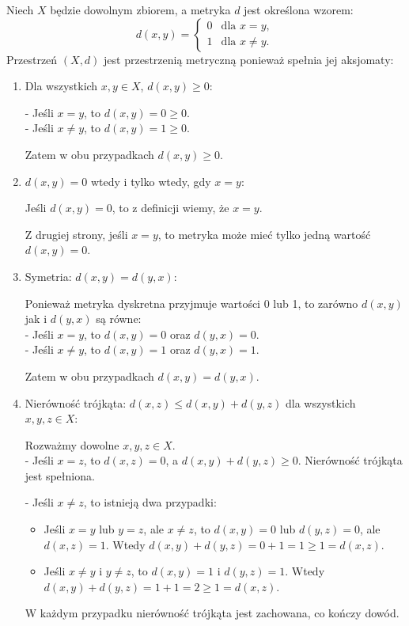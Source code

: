 \documentclass{article}
\theoremstyle{definition}
\theoremstyle{definition}
\theoremstyle{definition}
\theoremstyle{definition}
\theoremstyle{definition}
\theoremstyle{definition}
\theoremstyle{definition}
\begin{document}
Niech $X$ będzie dowolnym zbiorem, a metryka $d$ jest określona wzorem:
\[
d(x,y) = \begin{cases}
    0 & \text{dla } x=y, \\
    1 & \text{dla } x \neq y.
\end{cases}
\]
Przestrzeń \((X,d)\) jest przestrzenią metryczną ponieważ spełnia jej aksjomaty:
\begin{enumerate}
    \item Dla wszystkich \( x, y \in X \), \( d(x, y) \geq 0 \):
    
    - Jeśli \( x = y \), to \( d(x, y) = 0 \geq 0 \).\\
    - Jeśli \( x \neq y \), to \( d(x, y) = 1 \geq 0 \).
    
    Zatem w obu przypadkach \( d(x, y) \geq 0 \).
    
    \item \( d(x, y) = 0 \) wtedy i tylko wtedy, gdy \( x = y \):
    
    Jeśli \( d(x, y) = 0 \), to z definicji wiemy, że \( x = y \).

    Z drugiej strony, jeśli \( x = y \), to metryka może mieć tylko jedną wartość \( d(x, y) = 0 \).

    \item Symetria: \( d(x, y) = d(y, x) \):
    
    Ponieważ metryka dyskretna przyjmuje wartości 0 lub 1, to zarówno \( d(x, y) \) jak i \( d(y, x) \) są równe:\\
    - Jeśli \( x = y \), to \( d(x, y) = 0 \) oraz \( d(y, x) = 0 \).\\
    - Jeśli \( x \neq y \), to \( d(x, y) = 1 \) oraz \( d(y, x) = 1 \).
    
    Zatem w obu przypadkach \( d(x, y) = d(y, x) \).
    
    \item Nierówność trójkąta: \( d(x, z) \leq d(x, y) + d(y, z) \) dla wszystkich \( x, y, z \in X \):
    
    Rozważmy dowolne \( x, y, z \in X \).\\
    - Jeśli \( x = z \), to \( d(x, z) = 0 \), a \( d(x, y) + d(y, z) \geq 0 \). Nierówność trójkąta jest spełniona.
    
    - Jeśli \( x \neq z \), to istnieją dwa przypadki:
    \begin{itemize}
        \item Jeśli \( x = y \) lub \( y = z \), ale \( x \neq z \), to \( d(x, y) = 0 \) lub \( d(y, z) = 0 \), ale \( d(x, z) = 1 \). Wtedy \( d(x, y) + d(y, z) = 0 + 1 = 1 \geq 1 = d(x, z) \).
        
        \item Jeśli \( x \neq y \) i \( y \neq z \), to \( d(x, y) = 1 \) i \( d(y, z) = 1 \). Wtedy \( d(x, y) + d(y, z) = 1 + 1 = 2 \geq 1 = d(x, z) \).
    \end{itemize}
    
    W każdym przypadku nierówność trójkąta jest zachowana, co kończy dowód.
\end{enumerate}
\end{document}
